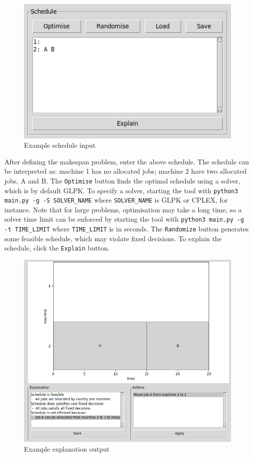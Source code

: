 \begin{figure}[H]
	\centering
	\includegraphics[scale=0.5]{figures/tool_schedule.png}
	\caption{Example schedule input}
\end{figure}

After defining the makespan problem, enter the above schedule. The schedule can be interpreted as: machine 1 has no allocated jobs; machine 2 have two allocated jobs, A and B. The \texttt{Optimise} button finds the optimal schedule using a solver, which is by default GLPK. To specify a solver, starting the tool with \texttt{python3 main.py -g -S SOLVER\_NAME} where \texttt{SOLVER\_NAME} is GLPK or CPLEX, for instance. Note that for large problems, optimisation may take a long time, so a solver time limit can be enforced by starting the tool with \texttt{python3 main.py -g -t TIME\_LIMIT} where \texttt{TIME\_LIMIT} is in seconds. The \texttt{Randomize} button generates some feasible schedule, which may violate fixed decisions. To explain the schedule, click the \texttt{Explain} button. 

\begin{figure}[H]
	\centering
	\includegraphics[width=\linewidth]{figures/tool_explain.png}
	\caption{Example explanation output}
\end{figure}

